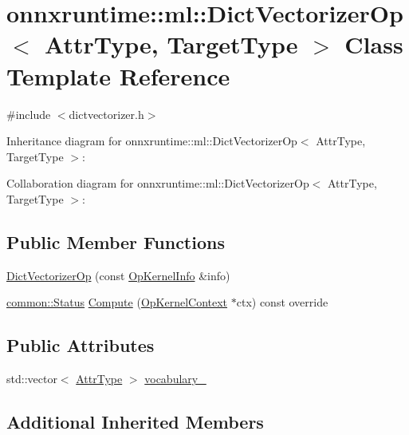 \hypertarget{classonnxruntime_1_1ml_1_1DictVectorizerOp}{}\section{onnxruntime\+:\+:ml\+:\+:Dict\+Vectorizer\+Op$<$ Attr\+Type, Target\+Type $>$ Class Template Reference}
\label{classonnxruntime_1_1ml_1_1DictVectorizerOp}


{\ttfamily \#include $<$dictvectorizer.\+h$>$}



Inheritance diagram for onnxruntime\+:\+:ml\+:\+:Dict\+Vectorizer\+Op$<$ Attr\+Type, Target\+Type $>$\+:


Collaboration diagram for onnxruntime\+:\+:ml\+:\+:Dict\+Vectorizer\+Op$<$ Attr\+Type, Target\+Type $>$\+:
\subsection*{Public Member Functions}
\begin{DoxyCompactItemize}
\item 
\mbox{\hyperlink{classonnxruntime_1_1ml_1_1DictVectorizerOp_aa94dc96b8541d7525374940254bd0e45}{Dict\+Vectorizer\+Op}} (const \mbox{\hyperlink{classonnxruntime_1_1OpKernelInfo}{Op\+Kernel\+Info}} \&info)
\item 
\mbox{\hyperlink{classonnxruntime_1_1common_1_1Status}{common\+::\+Status}} \mbox{\hyperlink{classonnxruntime_1_1ml_1_1DictVectorizerOp_ac7541aa5edf004dafc4132dfcc764865}{Compute}} (\mbox{\hyperlink{classonnxruntime_1_1OpKernelContext}{Op\+Kernel\+Context}} $\ast$ctx) const override
\end{DoxyCompactItemize}
\subsection*{Public Attributes}
\begin{DoxyCompactItemize}
\item 
std\+::vector$<$ \mbox{\hyperlink{namespaceonnxruntime_afb993460ae8432beef9db5f0cf10ca7c}{Attr\+Type}} $>$ \mbox{\hyperlink{classonnxruntime_1_1ml_1_1DictVectorizerOp_a2d5f881e36174f00790e9b3f16cc20b2}{vocabulary\+\_\+}}
\end{DoxyCompactItemize}
\subsection*{Additional Inherited Members}


